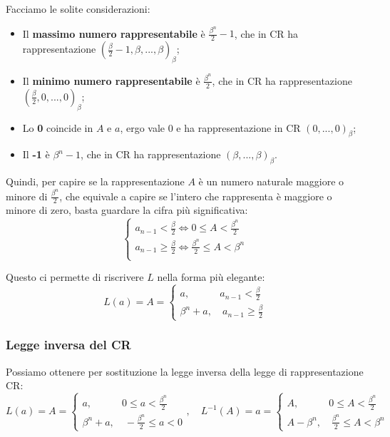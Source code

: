 \documentclass[a4paper,11pt]{article}
\begin{document}
Facciamo le solite considerazioni:

\begin{itemize}
	\item Il \textbf{massimo numero rappresentabile} è $\frac{\beta^n}{2} - 1$, che in CR ha rappresentazione $\left( \frac{\beta}{2} - 1, \beta, ..., \beta \right)_\beta$;
	\item Il \textbf{minimo numero rappresentabile} è $\frac{\beta^n}{2}$, che in CR ha rappresentazione $\left( \frac{\beta}{2}, 0, ..., 0 \right)_\beta$;
	\item Lo \textbf{0} coincide in $A$ e $a$, ergo vale 0 e ha rappresentazione in CR $\left( 0, ..., 0 \right)_\beta$;
	\item Il \textbf{-1} è $\beta^n-1$, che in CR ha rappresentazione $\left( \beta, ..., \beta \right)_\beta$.
\end{itemize}

Quindi, per capire se la rappresentazione $A$ è un numero naturale maggiore o minore di $\frac{\beta^n}{2}$, che equivale a capire se l'intero che rappresenta è maggiore o minore di zero, basta guardare la cifra più significativa:
\[
	\begin{cases}
		a_{n-1} < \frac{\beta}{2} \Leftrightarrow 0 \leq A < \frac{\beta^n}{2} \\ 	
		a_{n-1} \geq \frac{\beta}{2} \Leftrightarrow \frac{\beta^n}{2} \leq A < \beta^n \\ 	
	\end{cases}
\]

Questo ci permette di riscrivere $L$ nella forma più elegante:
\[
		L(a) = A =	
	\begin{cases}
		a, \quad \quad \quad  a_{n-1} < \frac{\beta}{2} \\ 
		\beta^n + a, \quad a_{n-1} \geq \frac{\beta}{2}
	\end{cases}
\]


\subsubsection{Legge inversa del CR}
Possiamo ottenere per sostituzione la legge inversa della legge di rappresentazione CR:
\[
		L(a) = A =	
	\begin{cases}
		a, \quad \quad \quad  0 \leq a < \frac{\beta^n}{2} \\ 
		\beta^n + a, \quad -\frac{\beta^n}{2} \leq a < 0
	\end{cases}, \quad 
		L^{-1}(A) = a =
	\begin{cases}
		A, \quad \quad \quad 0 \leq A < \frac{\beta^n}{2} \\ 
		A - \beta^n, \quad \frac{\beta^n}{2} \leq A < \beta^n 
	\end{cases} 
\]
\end{document}
